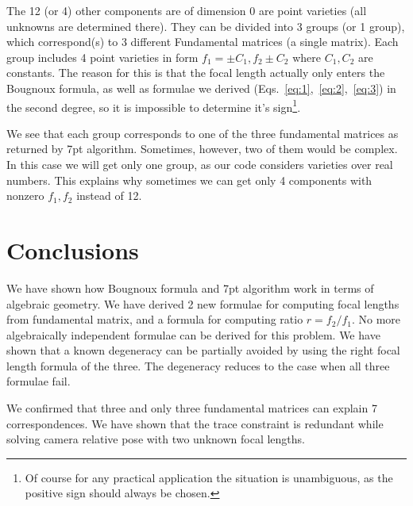 
The 12 (or 4) other components are of dimension 0 are point varieties (all  unknowns are determined there). They  can be divided into 3 groups (or 1 group), which correspond(s) to 3 different Fundamental matrices (a single matrix). Each group includes 4 point varieties in form $f_1 = \pm  C_1, f_2 \pm C_2$ where $C_1, C_2$ are constants. The reason for this is that the focal length actually only enters the Bougnoux formula, as well as formulae we derived (Eqs.~\ref{eq:1},~\ref{eq:2},~\ref{eq:3}) in the second degree, so it is impossible to determine it's sign\footnote{Of course for any practical application the situation is unambiguous, as the positive sign should always be chosen.}.

We see that each group corresponds to one of the three fundamental matrices as returned by 7pt algorithm. Sometimes, however, two of them would be complex. In this case we will get only one group, as our code considers varieties over real numbers. This explains why sometimes we can get only 4 components with nonzero $f_1, f_2$ instead of 12.


\section{Conclusions}

We have shown how Bougnoux formula and 7pt algorithm work in terms of algebraic geometry. We have derived 2 new formulae for computing focal lengths from fundamental matrix, and a formula for computing ratio $r = f_2 \slash f_1$. No more algebraically independent formulae can be derived for this problem.
We have shown that a known degeneracy \cite{HartZiss} can be partially avoided by using the right focal length formula of the three. The degeneracy reduces to the case when all three formulae fail.

We  confirmed that three and only three fundamental matrices can explain 7 correspondences. 
We have shown that the trace constraint is redundant while solving camera relative pose with two unknown focal lengths.